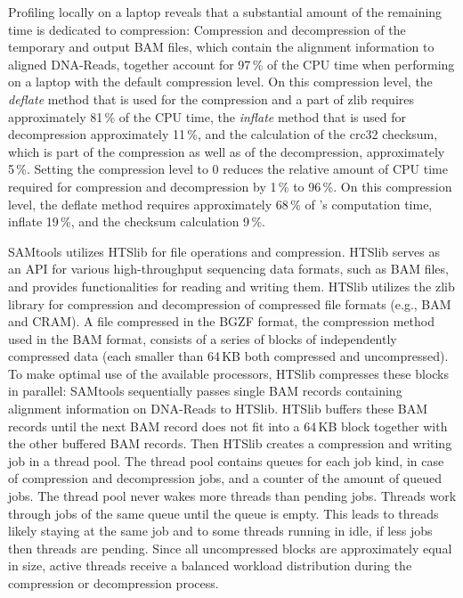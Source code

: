 Profiling \sort locally on a laptop reveals that a substantial amount of the remaining time is dedicated to compression:
Compression and decompression of the temporary and output BAM files, which contain the alignment information to aligned DNA-Reads, together account for 97\,\% of the CPU time when performing \sort on a laptop with the default compression level. On this compression level, the \textit{deflate} method that is used for the compression and a part of zlib requires approximately 81\,\% of the CPU time, the \textit{inflate} method that is used for decompression approximately 11\,\%, and the calculation of the crc32 checksum, which is part of the compression as well as of the decompression, approximately 5\,\%. Setting the compression level to 0 reduces the relative amount of CPU time required for compression and decompression by 1\,\% to 96\,\%. On this compression level, the deflate method requires approximately 68\,\% of \sort's computation time, inflate 19\,\%, and the checksum calculation 9\,\%.

SAMtools utilizes HTSlib for file operations and compression. HTSlib serves as an API for various high-throughput sequencing data formats, such as BAM files, and  provides functionalities for reading and writing them. HTSlib utilizes the zlib library for compression and decompression of compressed file formats (e.g., BAM and CRAM). A file compressed in the BGZF format, the compression method used in the BAM format, consists of a series of blocks of independently compressed data (each smaller than 64\,KB both compressed and uncompressed). To make optimal use of the available processors, HTSlib compresses these blocks in parallel: SAMtools sequentially passes single BAM records containing alignment information on DNA-Reads to HTSlib. HTSlib buffers these BAM records until the next BAM record does not fit into a 64\,KB block together with the other buffered BAM records. Then HTSlib creates a compression and writing job in a thread pool. The thread pool contains queues for each job kind, in case of \sort compression and decompression jobs, and a counter of the amount of queued jobs. The thread pool never wakes more threads than pending jobs. Threads work through jobs of the same queue until the queue is empty. This leads to threads likely staying at the same job and to some threads running in idle, if less jobs then threads are pending. Since all uncompressed blocks are approximately equal in size, active threads receive a balanced workload distribution during the compression or decompression process.


